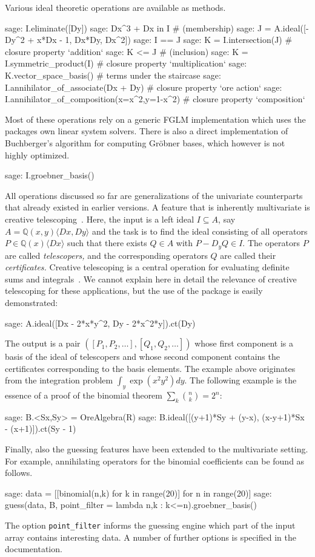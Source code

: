 \documentclass[11pt]{article}
\def\<#1>{\langle#1\rangle}
\let\set\mathbb
\begin{document}
Various ideal theoretic operations are available as methods. 
\begin{sageexample}
  sage: I.eliminate([Dy])
  sage: Dx^3 + Dx in I # (membership)
  sage: J = A.ideal([-Dy^2 + x*Dx - 1, Dx*Dy, Dx^2])
  sage: I == J
  sage: K = I.intersection(J) # closure property `addition`
  sage: K <= J # (inclusion)
  sage: K = I.symmetric_product(I) # closure property `multiplication`
  sage: K.vector_space_basis() # terms under the staircase
  sage: I.annihilator_of_associate(Dx + Dy) # closure property `ore action`
  sage: I.annihilator_of_composition(x=x^2,y=1-x^2) # closure property `composition`
\end{sageexample}
Most of these operations rely on a generic FGLM implementation which uses the packages own linear system solvers.
There is also a direct implementation of Buchberger's algorithm for computing Gr\"obner bases, which however is
not highly optimized. 
\begin{sageexample}
  sage: I.groebner_basis()
\end{sageexample}
All operations discussed so far are generalizations of the univariate counterparts that already existed
in earlier versions. A feature that is inherently multivariate is creative telescoping~\cite{zeilberger91,chyzak00,chyzak14}.
Here, the input is a left ideal $I\subseteq A$, say $A=\set Q(x,y)\<Dx,Dy>$ and the task is to find
the ideal consisting of all operators $P\in\set Q(x)\<Dx>$ such that there exists $Q\in A$ with $P-D_yQ\in I$.
The operators $P$ are called \emph{telescopers,} and the corresponding operators $Q$ are called their \emph{certificates.}
Creative telescoping is a central operation for evaluating definite sums and integrals~\cite{chyzak14}.
We cannot explain here in detail the relevance of creative telescoping for these applications, but the use of the
package is easily demonstrated:
\begin{sageexample}
  sage: A.ideal([Dx - 2*x*y^2, Dy - 2*x^2*y]).ct(Dy)
\end{sageexample}
The output is a pair $([P_1,P_2,\dots],[Q_1,Q_2,\dots])$ whose first component is a basis of the ideal of telescopers
and whose second component contains the certificates corresponding to the basis elements.
The example above originates from the integration problem $\int_y\exp(x^2y^2)dy$. The following example is the essence
of a proof of the binomial theorem $\sum_k\binom nk=2^n$:
\begin{sageexample}
  sage: B.<Sx,Sy> = OreAlgebra(R)
  sage: B.ideal([(y+1)*Sy + (y-x), (x-y+1)*Sx - (x+1)]).ct(Sy - 1)
\end{sageexample}
Finally, also the guessing features have been extended to the multivariate setting. For example, annihilating operators
for the binomial coefficients can be found as follows.
\begin{sageexample}
  sage: data = [[binomial(n,k) for k in range(20)] for n in range(20)]
  sage: guess(data, B, point_filter = lambda n,k : k<=n).groebner_basis()
\end{sageexample}
The option \verb|point_filter| informs the guessing engine which part of the input array contains interesting data.
A number of further options is specified in the documentation. 
\end{document}
